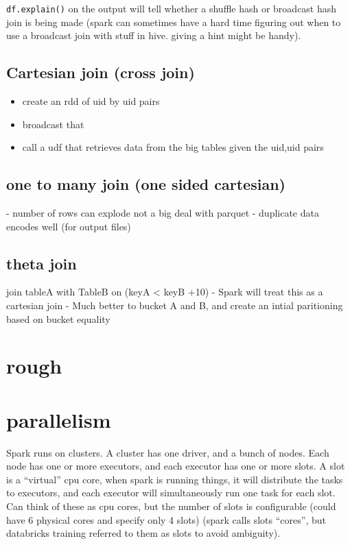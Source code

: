 \documentclass{article}
\begin{document}
    \verb|df.explain()| on the output will tell whether a shuffle hash or broadcast hash join is being made
    (spark can sometimes have a hard time figuring out when to use a broadcast join with stuff in hive. giving a hint might be handy).

\subsection{Cartesian join (cross join)}
\begin{itemize}
    \item create an rdd of uid by uid pairs
    \item broadcast that
    \item call a udf that retrieves data from the big tables given the uid,uid pairs
\end{itemize}

\subsection{one to many join (one sided cartesian)}
- number of rows can explode
not a big deal with parquet - duplicate data encodes well (for output files)

\subsection{theta join}
join tableA with TableB on (keyA < keyB +10)
  - Spark will treat this as a cartesian join
  - Much better to bucket A and B, and create an intial paritioning based on bucket equality

\section{rough}

\section{parallelism }
Spark runs on clusters. A cluster has one driver, and a bunch of nodes. Each node has one or more executors, and each executor has one or more slots. A slot is a ``virtual'' cpu core, when spark is running things, it will distribute the tasks to executors, and each executor will simultaneously run one task for each slot. Can think of these as cpu cores, but the number of slots is configurable (could have 6 physical cores and specify only 4 slots) (spark calls slots ``cores'', but databricks training referred to them as slots to avoid ambiguity). 
\end{document}
